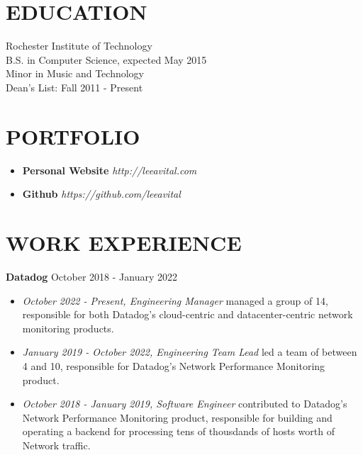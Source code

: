 \documentclass[line,margin]{res}
\begin{document}
\address{(646) 320-9143\\leeavital@gmail.com}

\begin{resume}

\section{EDUCATION}   Rochester Institute of Technology \\
                      B.S. in  Computer Science,  expected May 2015 \\
	                    Minor in Music and Technology\\
	                    Dean's List: Fall 2011 - Present


\section{PORTFOLIO}

\begin{itemize}
\item {\bf Personal Website}  {\sl http://leeavital.com}
\item {\bf Github} {\sl  https://github.com/leeavital }
\end{itemize}



\section{WORK EXPERIENCE}

{\bf Datadog} \hfill October 2018 - January 2022 \\
\begin{itemize}
  \item \textit{October 2022 - Present, Engineering Manager} managed a group of 14, responsible for both Datadog's cloud-centric and datacenter-centric network monitoring products.
  \item \textit{January 2019 - October 2022, Engineering Team Lead} led a team of between 4 and 10, responsible for Datadog's Network Performance Monitoring product.
  \item \textit{October 2018 - January 2019, Software Engineer} contributed to Datadog's Network Performance Monitoring product, responsible for building and operating a backend for processing tens of thousdands of hosts worth of Network traffic.
\end{itemize}


\end{resume}
\end{document}
